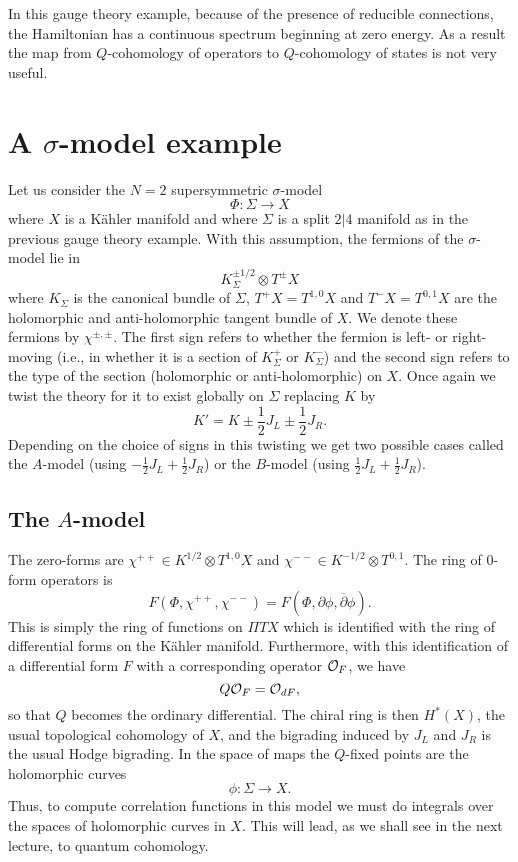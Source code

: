 In this gauge theory example, because of the presence of reducible
connections, the Hamiltonian has a continuous
spectrum beginning at zero energy.  As a result
 the map from $Q$-cohomology of operators
to $Q$-cohomology of states is not very useful.


\section{A $\sigma$-model example}

Let us consider the $N=2$ supersymmetric $\sigma$-model 
$$\Phi\colon \Sigma\to X$$
where $X$ is a K\"ahler manifold and where $\Sigma$ is a split $2|4$
manifold as in the previous gauge theory example.
With this assumption, the fermions of the $\sigma$-model lie in
$$K_\Sigma ^{\pm 1/2}\otimes T^\pm X$$
where $K_\Sigma$ is the canonical bundle of $\Sigma$,
$T^+X=T^{1,0}X$ and $T^-X=T^{0,1}X$ are the holomorphic and
anti-holomorphic tangent bundle of $X$.
We denote these fermions by $\chi^{\pm,\pm}$.
The first sign refers to whether the fermion is left- or right-moving
(i.e., in whether it is a section of $K_\Sigma^+$ or $K_\Sigma^-$) and
the second sign refers to the type of the section 
(holomorphic or anti-holomorphic) on $X$.
Once again we twist the theory for it to exist globally on $\Sigma$
replacing $K$ by
$$K'=K\pm \frac{1}{2}J_L\pm \frac{1}{2} J_R.$$
Depending on the choice of signs in this twisting we get two possible
cases called the $A$-model (using $-\frac{1}{2}J_L+\frac{1}{2}J_R$) or
the $B$-model (using $\frac{1}{2}J_L+\frac{1}{2}J_R$).

\subsection{The $A$-model}

The zero-forms are $\chi^{++}\in K^{1/2}\otimes T^{1,0}X$ and
$\chi^{--}\in K^{-1/2}\otimes T^{0,1}$. The ring of $0$-form
operators is
$$F(\Phi,\chi^{++},\chi^{--})=F(\Phi,\partial \phi,\overline\partial
\phi).$$
This is simply the ring of functions on $\Pi TX$ which  is identified
with the ring of differential forms on the K\"ahler manifold.
Furthermore, with this identification of a differential form $F$ with
a corresponding operator ${\cal O}_F$, we have
$$Q{\cal O}_F={\cal O}_{dF},$$
so that 
$Q$ becomes the ordinary differential.
The chiral ring is then $H^*(X)$, the usual topological cohomology of
$X$, and the bigrading induced by $J_L$ and $J_R$ is the usual Hodge
bigrading.
In the space of maps the $Q$-fixed points are the holomorphic curves
$$\phi\colon \Sigma\to X.$$
Thus, to compute correlation functions in this model we must do integrals
over the spaces of holomorphic curves in $X$. This will lead, as we
shall see in the next lecture, to quantum cohomology.

